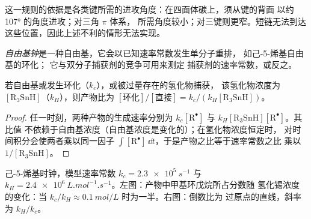这一规则的依据是各类键所需的进攻角度：在四面体碳上，须从键的背面
以约 107° 的角度进攻；对三角 $\pi$ 体系，
所需角度较小；对三键则更窄。短链无法到达
这些位置，因此上述不利的情形无法实现。

\begin{definition}[自由基钟]\label{def:b3:radicals-carbenes:radical-clock}
\emph{自由基钟}是一种自由基，它会以已知速率常数发生单分子重排，
如己-5-烯基自由基的环化；
它与双分子捕获剂的竞争可用来测定
捕获剂的速率常数，或反之。
\end{definition}

\begin{proposition}[竞争动力学]\label{prop:b3:radicals-carbenes:clock}
若自由基或发生环化（$k_c$），或被过量存在的氢化物捕获，
该氢化物浓度为 $[\mathrm{R_3SnH}]$（$k_H$），则产物比为
$[\text{环化}]/[\text{直接}] = k_c/(k_H[\mathrm{R_3SnH}])$。
\end{proposition}

\begin{proof}
任一时刻，两种产物的生成速率分别为 $k_c[\mathrm R^\bullet]$ 与 $k_H[\mathrm{R_3SnH}][\mathrm R^\bullet]$。其比值
不依赖于自由基浓度（自由基浓度是变化的）；在氢化物浓度恒定时，
对时间积分会使两者乘以同一因子
$\int[\mathrm R^\bullet]\,\dd t$，于是产物之比等于速率常数之比
乘以 $1/[\mathrm{R_3SnH}]$。
\end{proof}

\begin{omfigure}

{\small 己-5-烯基时钟，模型速率常数 $k_c = \qty{2.3e5}{s^{-1}}$ 与
$k_H = \qty{2.4e6}{L.mol^{-1}.s^{-1}}$。左图：产物中甲基环戊烷所占分数随
氢化锡浓度的变化：当 $k_c/k_H \approx \qty{0.1}{mol/L}$ 时为一半。右图：倒数比为
过原点的直线，斜率为 $k_H/k_c$。}
\end{omfigure}

